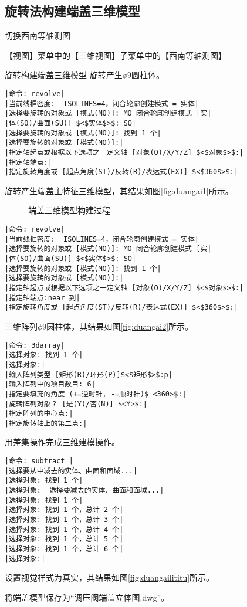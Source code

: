 \subsection{旋转法构建端盖三维模型}
\begin{procedure}
\item 切换西南等轴测图

【视图】菜单中的【三维视图】子菜单中的【西南等轴测图】
\item 旋转构建端盖三维模型
旋转产生$\phi 9$圆柱体。
\begin{lstlisting}
|命令: revolve|
|当前线框密度:  ISOLINES=4，闭合轮廓创建模式 = 实体|
|选择要旋转的对象或 [模式(MO)]: MO 闭合轮廓创建模式 [实|
|体(SO)/曲面(SU)] $<$实体$>$: SO|
|选择要旋转的对象或 [模式(MO)]: 找到 1 个|
|选择要旋转的对象或 [模式(MO)]:|
|指定轴起点或根据以下选项之一定义轴 [对象(O)/X/Y/Z] $<$对象$>$:|
|指定轴端点:|
|指定旋转角度或 [起点角度(ST)/反转(R)/表达式(EX)] $<$360$>$:|
\end{lstlisting}
旋转产生端盖主特征三维模型，其结果如图\ref{fig:duangai1}所示。
\begin{figure}[htbp]
\centering
{}\hspace{30pt}
\hspace{30pt}
\caption{端盖三维模型构建过程}
\end{figure}
\begin{lstlisting}
|命令: revolve|
|当前线框密度:  ISOLINES=4，闭合轮廓创建模式 = 实体|
|选择要旋转的对象或 [模式(MO)]: MO 闭合轮廓创建模式 [实|
|体(SO)/曲面(SU)] $<$实体$>$: SO|
|选择要旋转的对象或 [模式(MO)]: 找到 1 个|
|选择要旋转的对象或 [模式(MO)]:|
|指定轴起点或根据以下选项之一定义轴 [对象(O)/X/Y/Z] $<$对象$>$:|
|指定轴端点:near 到|
|指定旋转角度或 [起点角度(ST)/反转(R)/表达式(EX)] $<$360$>$:|
\end{lstlisting}
\item 三维阵列$\phi 9$圆柱体，其结果如图\ref{fig:duangai2}所示。
\begin{lstlisting}
|命令: 3darray|
|选择对象: 找到 1 个|
|选择对象:|
|输入阵列类型 [矩形(R)/环形(P)]$<$矩形$>$:p|
|输入阵列中的项目数目: 6|
|指定要填充的角度 (+=逆时针, -=顺时针)$ <360>$:|
|旋转阵列对象？ [是(Y)/否(N)] $<Y>$:|
|指定阵列的中心点:|
|指定旋转轴上的第二点:|
\end{lstlisting}
\item 用差集操作完成三维建模操作。
\begin{lstlisting}
|命令: subtract |
|选择要从中减去的实体、曲面和面域...|
|选择对象: 找到 1 个|
|选择对象:  选择要减去的实体、曲面和面域...|
|选择对象: 找到 1 个|
|选择对象: 找到 1 个，总计 2 个|
|选择对象: 找到 1 个，总计 3 个|
|选择对象: 找到 1 个，总计 4 个|
|选择对象: 找到 1 个，总计 5 个|
|选择对象: 找到 1 个，总计 6 个|
|选择对象:|
\end{lstlisting}
\item 设置视觉样式为真实，其结果如图\ref{fig:duangailititu}所示。
\item 将端盖模型保存为“调压阀端盖立体图.dwg”。
\end{procedure}
\endinput